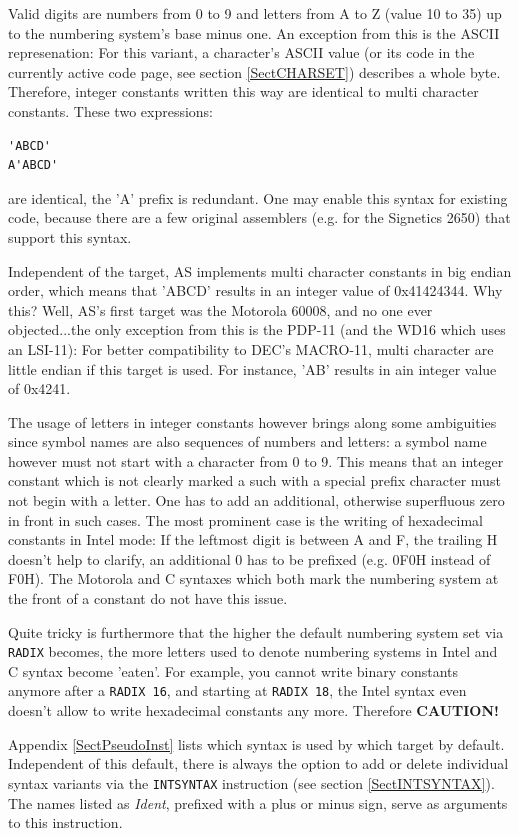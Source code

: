 \documentclass[12pt,twoside]{report}
\newcommand{\ii}[1]{{\it #1}}
\newcommand{\tty}[1]{{\tt #1}}
\newcommand{\asname}{{AS}}
\begin{document}
Valid digits are numbers from 0 to 9 and letters from A to Z (value 10 to
35) up to the numbering system's base minus one. An exception from this is
the ASCII represenation: For this variant, a character's ASCII value (or its
code in the currently active code page, see section \ref{SectCHARSET})
describes a whole byte.  Therefore, integer constants written this way
are identical to multi character constants.  These two expressions:
\begin{verbatim}
'ABCD'
A'ABCD'
\end{verbatim}
are identical, the 'A' prefix is redundant.  One may enable this syntax
for existing code, because there are a few original assemblers (e.g.
for the Signetics 2650) that support this syntax. 

Independent of the target, \asname{} implements multi character constants
in big endian order, which means that 'ABCD' results in an integer
value of 0x41424344.  Why this? Well, \asname{}'s first target was the
Motorola 60008, and no one ever objected...the only exception from
this is the PDP-11 (and the WD16 which uses an LSI-11): For better
compatibility to DEC's MACRO-11, multi character are little endian
if this target is used.  For instance, 'AB' results in ain integer
value of 0x4241.

The usage of letters in integer constants however brings along some ambiguities
since symbol names are also sequences of numbers and letters: a symbol name
however must not start with a character from 0 to 9.  This means that an
integer constant which is not clearly marked a such with a special prefix
character must not begin with a letter.  One has to add an additional,
otherwise superfluous zero in front in such cases.  The most prominent case
is the writing of hexadecimal constants in Intel mode:  If the leftmost digit
is between A and F, the trailing H doesn't help to clarify, an additional 0
has to be prefixed (e.g. 0F0H instead of F0H).  The Motorola and C syntaxes
which both mark the numbering system at the front of a constant do not have
this issue.

Quite tricky is furthermore that the higher the default numbering system
set via {\tt RADIX} becomes, the more letters used to denote numbering
systems in Intel and C syntax become 'eaten'.  For example, you cannot
write binary constants anymore after a {\tt RADIX 16}, and starting at
{\tt RADIX 18}, the Intel syntax even doesn't allow to write hexadecimal
constants any more.  Therefore {\bf CAUTION!}

Appendix \ref{SectPseudoInst} lists which syntax is used by which target
by default.  Independent of this default, there is always the option to
add or delete individual syntax variants via the \tty{INTSYNTAX} instruction
(see section \ref{SectINTSYNTAX}).  The names listed as \ii{Ident},
prefixed with a plus or minus sign, serve as arguments to this instruction.
\end{document}
